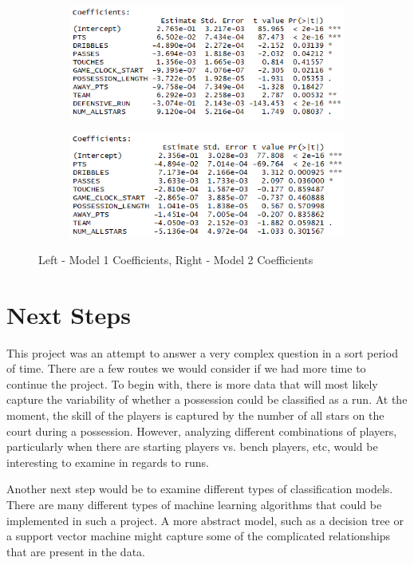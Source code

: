 \documentclass{article}
\begin{document}
\begin{figure}[h]
\centering
\begin{subfigure}{.5\textwidth}
  \centering
  \includegraphics[width=\linewidth]{odds_run_for.png}
  \label{fig:sub1}
\end{subfigure}%
\begin{subfigure}{.5\textwidth}
  \centering
  \includegraphics[width=\linewidth]{odds_run_against.png}
  \label{fig:sub2}
\end{subfigure}
\caption{Left - Model 1 Coefficients, Right - Model 2 Coefficients}
\label{fig:test}
\end{figure}

\section{Next Steps}

This project was an attempt to answer a very complex question in a sort period of time. There are a few routes we would consider if we had more time to continue the project. To begin with, there is more data that will most likely capture the variability of whether a possession could be classified as a run. At the moment, the skill of the players is captured by the number of all stars on the court during a possession. However, analyzing different combinations of players, particularly when there are starting players vs. bench players, etc, would be interesting to examine in regards to runs. \newline

Another next step would be to examine different types of classification models. There are many different types of machine learning algorithms that could be implemented in such a project. A more abstract model, such as a decision tree or a support vector machine might capture some of the complicated relationships that are present in the data. 
 
\end{document}

